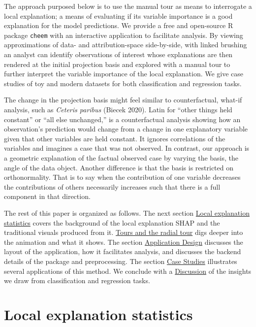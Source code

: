 \documentclass[
]{article}
\begin{document}
The approach purposed below is to use the manual tour as means to interrogate a local explanation; a means of evaluating if its variable importance is a good explanation for the model predictions. We provide a free and open-source R package \texttt{cheem} with an interactive application to facilitate analysis. By viewing approximations of data- and attribution-space side-by-side, with linked brushing an analyst can identify observations of interest whose explanations are then rendered at the initial projection basis and explored with a manual tour to further interpret the variable importance of the local explanation. We give case studies of toy and modern datasets for both classification and regression tasks.

The change in the projection basis might feel similar to counterfactual, what-if analysis, such as \emph{Ceteris paribus} (Biecek 2020). Latin for ``other things held constant'' or ``all else unchanged,'' is a counterfactual analysis showing how an observation's prediction would change from a change in one explanatory variable given that other variables are held constant. It ignores correlations of the variables and imagines a case that was not observed. In contrast, our approach is a geometric explanation of the factual observed case by varying the basis, the angle of the data object. Another difference is that the basis is restricted on orthonormality. That is to say when the contribution of one variable decreases the contributions of others necessarily increases such that there is a full component in that direction.

The rest of this paper is organized as follows. The next section \protect\hyperlink{sec:explanations}{Local explanation statistics} covers the background of the local explanation SHAP and the traditional visuals produced from it. \protect\hyperlink{sec:tour}{Tours and the radial tour} digs deeper into the animation and what it shows. The section \protect\hyperlink{sec:applicationdesign}{Application Design} discusses the layout of the application, how it facilitates analysis, and discusses the backend details of the package and preprocessing. The section \protect\hyperlink{sec:casestudies}{Case Studies} illustrates several applications of this method. We conclude with a \protect\hyperlink{sec:discussion}{Discussion} of the insights we draw from classification and regression tasks.

\hypertarget{sec:explanations}{%
\section{Local explanation statistics}\label{sec:explanations}}
\end{document}
